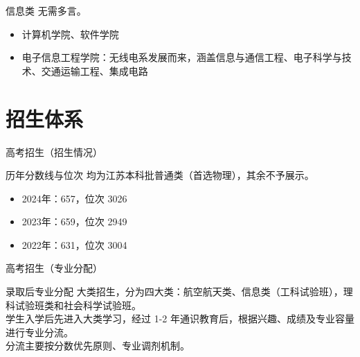 \documentclass[
    12pt,
    aspectratio=169
]{beamer}
\begin{document}
\begin{frame}{信息类}
    无需多言。
    \begin{itemize}[<+->]
    \item \srfamily 计算机学院、软件学院
    \item \srfamily 电子信息工程学院：\ttfamily 无线电系发展而来，涵盖信息与通信工程、电子科学与技术、交通运输工程、集成电路
    \end{itemize}
\end{frame}

\section{招生体系}

\begin{frame}{高考招生（招生情况）}
    \begin{block}{历年分数线与位次}
        \rmfamily 
        均为江苏本科批普通类（首选物理），其余不予展示。
        \begin{itemize}
            \item 2024年：657，位次 3026
            \item 2023年：659，位次 2949
            \item 2022年：631，位次 3004
        \end{itemize}
    \end{block}
\end{frame}

\begin{frame}{高考招生（专业分配）}
    \begin{block}{录取后专业分配}
        \rmfamily
        大类招生，分为四大类：‌航空航天类、‌信息类（‌工科试验班），理科试验班类和社会科学试验班。\\
        学生入学后先进入大类学习，经过 1-2 年通识教育后，根据兴趣、成绩及专业容量进行专业分流‌。\\
        分流主要按分数优先原则、专业调剂机制。
    \end{block}
\end{frame}
    
\end{document}
